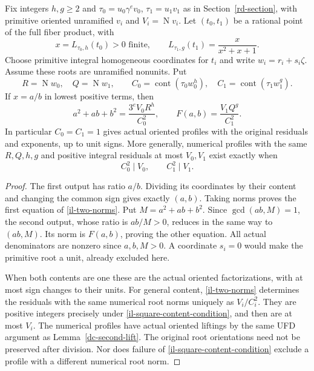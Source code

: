 \begin{theorem}\label{il-double-inverse}
Fix integers $h,g\ge2$ and $\tau_0=u_0\gamma^e v_0$,
$\tau_1=u_1v_1$ as in
Section~\ref{rd-section}, with primitive oriented unramified
$v_i$ and $V_i=\operatorname N v_i$. Let $(t_0,t_1)$ be a
rational point of the full fiber product, with
\begin{equation}\label{il-point-domain}
 x=L_{\tau_0,h}(t_0)>0\text{ finite},\qquad
 L_{\tau_1,g}(t_1)=\frac{x}{x^2+x+1}.
\end{equation}
Choose primitive integral homogeneous coordinates for $t_i$ and
write $w_i=r_i+s_i\zeta$. Assume these roots are unramified
nonunits. Put
\[
 R=\operatorname N w_0,\quad Q=\operatorname N w_1,\qquad
 C_0=\operatorname{cont}(\tau_0w_0^h),\quad
 C_1=\operatorname{cont}(\tau_1w_1^g).
\]
If $x=a/b$ in lowest positive terms, then
\begin{equation}\label{il-two-norms}
 a^2+ab+b^2=\frac{3^eV_0R^h}{C_0^2},\qquad
 F(a,b)=\frac{V_1Q^g}{C_1^2}.
\end{equation}
In particular $C_0=C_1=1$ gives actual oriented profiles with
the original residuals and exponents, up to unit signs. More
generally, numerical profiles with the same $R,Q,h,g$ and
positive integral residuals at most $V_0,V_1$ exist exactly when
\begin{equation}\label{il-square-content-condition}
 C_0^2\mid V_0,\qquad C_1^2\mid V_1.
\end{equation}
\end{theorem}
\begin{proof}
The first output has ratio $a/b$. Dividing its coordinates by
their content and changing the common sign gives exactly $(a,b)$.
Taking norms proves the first equation of \eqref{il-two-norms}.
Put $M=a^2+ab+b^2$. Since $\gcd(ab,M)=1$, the second output,
whose ratio is $ab/M>0$, reduces in the same way to $(ab,M)$.
Its norm is $F(a,b)$, proving the other equation. All actual
denominators are nonzero since $a,b,M>0$. A coordinate $s_i=0$
would make the primitive root a unit, already excluded here.

When both contents are one these are the actual oriented
factorizations, with at most sign changes to their units. For
general content, \eqref{il-two-norms} determines the residuals
with the same numerical root norms uniquely as $V_i/C_i^2$.
They are positive integers precisely under
\eqref{il-square-content-condition}, and then are at most $V_i$.
The numerical profiles have actual oriented liftings by the same
UFD argument as Lemma~\ref{dc-second-lift}. The original root
orientations need not be preserved after division. Nor does failure
of \eqref{il-square-content-condition} exclude a profile with a
different numerical root norm.
\end{proof}

